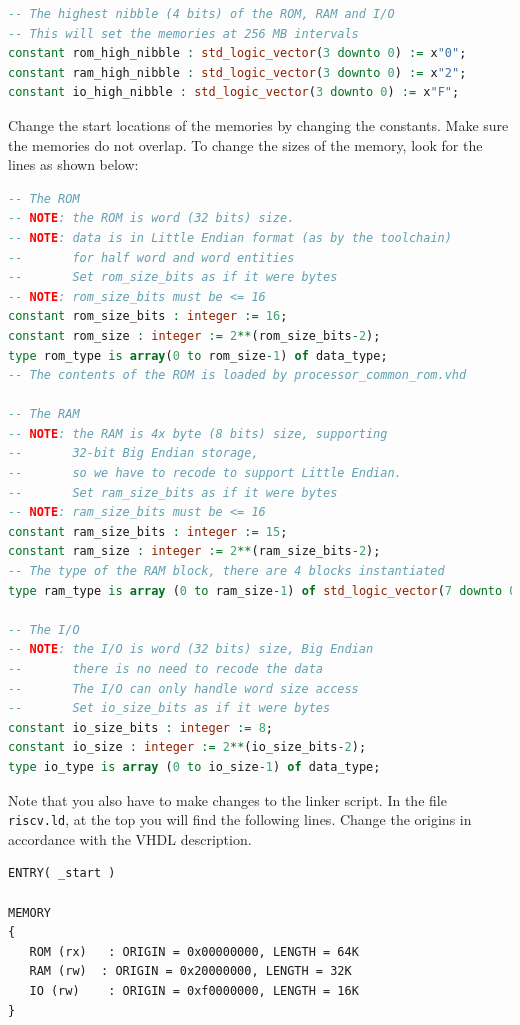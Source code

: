 \documentclass[12pt]{article}
\begin{document}
\begin{lstlisting}[language=VHDL]
-- The highest nibble (4 bits) of the ROM, RAM and I/O
-- This will set the memories at 256 MB intervals
constant rom_high_nibble : std_logic_vector(3 downto 0) := x"0";
constant ram_high_nibble : std_logic_vector(3 downto 0) := x"2";
constant io_high_nibble : std_logic_vector(3 downto 0) := x"F";
\end{lstlisting}

Change the start locations of the memories by changing the constants. Make sure the memories do not overlap. To change the sizes of the memory, look for the lines as shown below:

\begin{lstlisting}[language=VHDL]
-- The ROM
-- NOTE: the ROM is word (32 bits) size.
-- NOTE: data is in Little Endian format (as by the toolchain)
--       for half word and word entities
--       Set rom_size_bits as if it were bytes
-- NOTE: rom_size_bits must be <= 16
constant rom_size_bits : integer := 16;
constant rom_size : integer := 2**(rom_size_bits-2);
type rom_type is array(0 to rom_size-1) of data_type;
-- The contents of the ROM is loaded by processor_common_rom.vhd

-- The RAM
-- NOTE: the RAM is 4x byte (8 bits) size, supporting
--       32-bit Big Endian storage,
--       so we have to recode to support Little Endian.
--       Set ram_size_bits as if it were bytes
-- NOTE: ram_size_bits must be <= 16
constant ram_size_bits : integer := 15;
constant ram_size : integer := 2**(ram_size_bits-2);
-- The type of the RAM block, there are 4 blocks instantiated
type ram_type is array (0 to ram_size-1) of std_logic_vector(7 downto 0);
                    
-- The I/O
-- NOTE: the I/O is word (32 bits) size, Big Endian
--       there is no need to recode the data
--       The I/O can only handle word size access
--       Set io_size_bits as if it were bytes
constant io_size_bits : integer := 8;
constant io_size : integer := 2**(io_size_bits-2);
type io_type is array (0 to io_size-1) of data_type;
\end{lstlisting}

Note that you also have to make changes to the linker script. In the file \texttt{riscv.ld}, at the top you will find the following lines. Change the origins in accordance with the VHDL description.

\begin{lstlisting}
ENTRY( _start )

MEMORY
{
   ROM (rx)   : ORIGIN = 0x00000000, LENGTH = 64K
   RAM (rw)  : ORIGIN = 0x20000000, LENGTH = 32K
   IO (rw)    : ORIGIN = 0xf0000000, LENGTH = 16K
}
\end{lstlisting}
\end{document}

